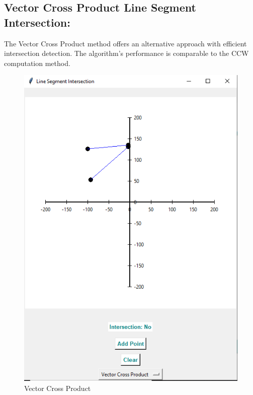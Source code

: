 \subsection{\textbf{Vector Cross Product Line Segment Intersection:}}

The Vector Cross Product method offers an alternative approach with efficient intersection detection. The algorithm’s performance is comparable to the CCW computation method.

\begin{figure}[h]
    \centering
    \includegraphics[width=1\linewidth]{vcp.PNG}
    \caption{Vector Cross Product}
    \label{fig:vcp}
\end{figure}
